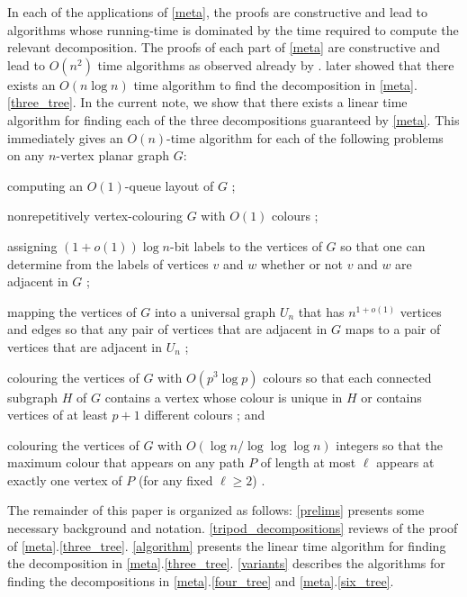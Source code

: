 \documentclass{patmorin}
\begin{document}
In each of the applications of \cref{meta}, the proofs are constructive and lead to algorithms whose running-time is dominated by the time required to compute the relevant decomposition.  The proofs of each part of \cref{meta} are constructive and lead to $O(n^2)$ time algorithms as observed already by \citet{dujmovic.joret.ea:planar}.  \citet{morin:fast} later showed that there exists an $O(n\log n)$ time algorithm to find the decomposition in \cref{meta}.\ref{three_tree}.  In the current note, we show that there exists a linear time algorithm for finding each of the three decompositions guaranteed by \cref{meta}.  This immediately gives an $O(n)$-time algorithm for each of the following problems on any $n$-vertex planar graph $G$:
\begin{compactitem}
  \item computing an $O(1)$-queue layout of $G$ \cite{dujmovic.joret.ea:planar};
  \item nonrepetitively vertex-colouring $G$ with $O(1)$ colours \cite{dujmovic.esperet.ea:planar};
  \item assigning $(1+o(1))\log n$-bit labels to the vertices of $G$ so that one can determine from the labels of vertices $v$ and $w$ whether or not $v$ and $w$ are adjacent in $G$ \cite{dujmovic.esperet.ea:adjacency};
  \item mapping the vertices of $G$ into a universal graph $U_n$ that has $n^{1+o(1)}$ vertices and edges so that any pair of vertices that are adjacent in $G$ maps to a pair of vertices that are adjacent in $U_n$ \cite{esperet.joret.ea:sparse};
  \item colouring the vertices of $G$ with $O(p^3\log p)$ colours so that each connected subgraph $H$ of $G$ contains a vertex whose colour is unique in $H$ or contains vertices of at least $p+1$ different colours \cite{debski.felsner.ea:improved}; and
  \item colouring the vertices of $G$ with $O(\log n/\log\log\log n)$ integers so that the maximum colour that appears on any path $P$ of length at most $\ell$ appears at exactly one vertex of $P$ (for any fixed $\ell\ge 2$) \cite{bose.dujmovic.ea:asymptotically}.
\end{compactitem}

The remainder of this paper is organized as follows: \cref{prelims} presents some necessary background and notation.  \cref{tripod_decompositions} reviews of the proof of \cref{meta}.\ref{three_tree}.  \cref{algorithm} presents the linear time algorithm for finding the decomposition in \cref{meta}.\ref{three_tree}.  \cref{variants} describes the algorithms for finding the decompositions in \cref{meta}.\ref{four_tree} and \cref{meta}.\ref{six_tree}.
\end{document}
